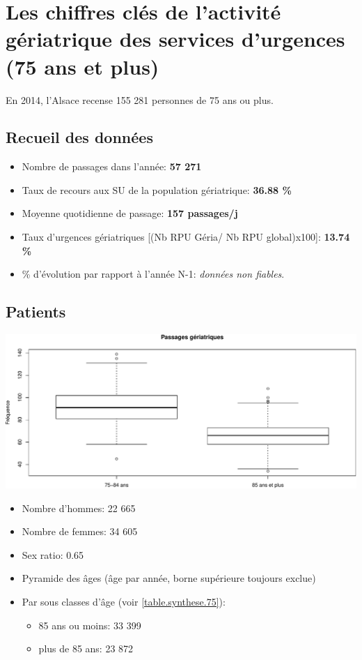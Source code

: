 \documentclass[]{article}
\begin{document}
\section{Les chiffres clés de l'activité gériatrique des services
d'urgences (75 ans et
plus)}\label{les-chiffres-cles-de-lactivite-geriatrique-des-services-durgences-75-ans-et-plus}

En 2014, l'Alsace recense 155 281 personnes de 75 ans ou plus.

\subsection{Recueil des données}\label{recueil-des-donnees-2}

\begin{itemize}
\itemsep1pt\parskip0pt
\item
  Nombre de passages dans l'année: \textbf{57 271}
\item
  Taux de recours aux SU de la population gériatrique: \textbf{36.88 \%}
\item
  Moyenne quotidienne de passage: \textbf{157 passages/j}
\item
  Taux d'urgences gériatriques {[}(Nb RPU Géria/ Nb RPU global)x100{]}:
  \textbf{13.74 \%}
\item
  \% d'évolution par rapport à l'année N-1: \emph{données non fiables}.
\end{itemize}

\subsection{Patients}\label{patients-2}

\includegraphics{Figs/sexe75-1.pdf}

\begin{itemize}
\item
  Nombre d'hommes: 22 665
\item
  Nombre de femmes: 34 605
\item
  Sex ratio: 0.65
\item
  Pyramide des âges (âge par année, borne supérieure toujours exclue)
\item
  Par sous classes d'âge (voir \ref{table.synthese.75}):

  \begin{itemize}
  \itemsep1pt\parskip0pt
  \item
    85 ans ou moins: 33 399
  \item
    plus de 85 ans: 23 872
  \end{itemize}
\end{itemize}
\end{document}
